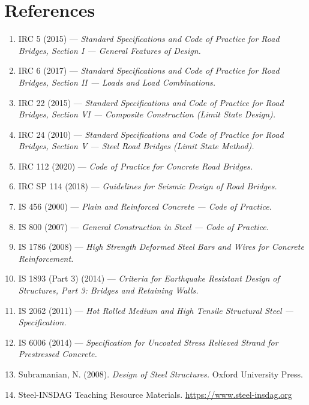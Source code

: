 \documentclass[12pt,a4paper]{report}
\numberwithin{table}{chapter}
\numberwithin{figure}{chapter}
\begin{document}
\chapter*{References}

\begin{enumerate}

\item IRC 5 (2015) --- \textit{Standard Specifications and Code of Practice for Road Bridges, Section I --- General Features of Design.}

\item IRC 6 (2017) --- \textit{Standard Specifications and Code of Practice for Road Bridges, Section II --- Loads and Load Combinations.}

\item IRC 22 (2015) --- \textit{Standard Specifications and Code of Practice for Road Bridges, Section VI --- Composite Construction (Limit State Design).}

\item IRC 24 (2010) --- \textit{Standard Specifications and Code of Practice for Road Bridges, Section V --- Steel Road Bridges (Limit State Method).}

\item IRC 112 (2020) --- \textit{Code of Practice for Concrete Road Bridges.}

\item IRC SP 114 (2018) --- \textit{Guidelines for Seismic Design of Road Bridges.}

\item IS 456 (2000) --- \textit{Plain and Reinforced Concrete --- Code of Practice.}

\item IS 800 (2007) --- \textit{General Construction in Steel --- Code of Practice.}

\item IS 1786 (2008) --- \textit{High Strength Deformed Steel Bars and Wires for Concrete Reinforcement.}

\item IS 1893 (Part 3) (2014) --- \textit{Criteria for Earthquake Resistant Design of Structures, Part 3:\allowbreak{} Bridges and Retaining Walls.}

\item IS 2062 (2011) --- \textit{Hot Rolled Medium and High Tensile Structural Steel --- Specification.}

\item IS 6006 (2014) --- \textit{Specification for Uncoated Stress Relieved Strand for Prestressed Concrete.}

\item Subramanian, N. (2008). \textit{Design of Steel Structures.} Oxford University Press.

\item Steel-INSDAG Teaching Resource Materials. \url{https://www.steel-insdag.org}

\end{enumerate}
\end{document}
